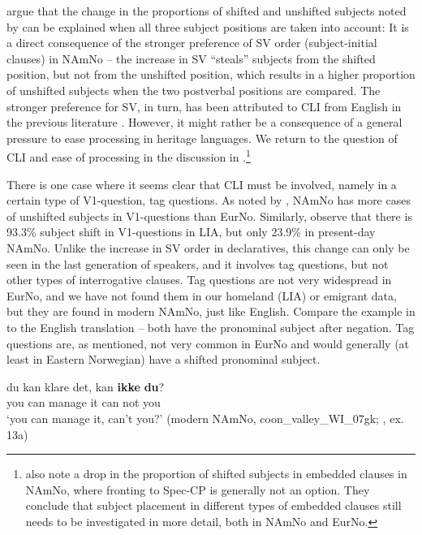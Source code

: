 \documentclass[output=paper]{langscibook}
\begin{document}
\citet{LarssonForthcoming} argue that the change in the proportions of shifted and unshifted subjects noted by \citet{AnderssenWestergaard2020} can be explained when all three subject positions are taken into account: It is a direct consequence of the stronger preference of SV order (subject-initial clauses) in NAmNo – the increase in SV “steals” subjects from the shifted position, but not from the unshifted position, which results in a higher proportion of unshifted subjects when the two postverbal positions are compared. The stronger preference for SV, in turn, has been attributed to CLI from English in the previous literature \citep{WestergaardEtAl2021}. However, it might rather be a consequence of a general pressure to ease processing in heritage languages. We return to the question of CLI and ease of processing in the discussion in .\footnote{\citet{LarssonForthcoming} also note a drop in the proportion of shifted subjects in embedded clauses in NAmNo, where fronting to Spec-CP is generally not an option. They conclude that subject placement in different types of embedded clauses still needs to be investigated in more detail, both in NAmNo and EurNo.}\largerpage 

There is one case where it seems clear that CLI must be involved, namely in a certain type of V1-question, tag questions. As noted by \citet{AnderssenWestergaard2020}, NAmNo has more cases of unshifted subjects in V1-questions than EurNo. Similarly, \citet{LarssonForthcoming} observe that there is 93.3\% subject shift in V1-questions in LIA, but only 23.9\% in present-day NAmNo. Unlike the increase in SV order in declaratives, this change can only be seen in the last generation of speakers, and it involves tag questions, but not other types of interrogative clauses. Tag questions are not very widespread in EurNo, and we have not found them in our homeland (LIA) or emigrant data, but they are found in modern NAmNo, just like English. Compare the example in  to the English translation – both have the pronominal subject after negation. Tag questions are, as mentioned, not very common in EurNo and would generally (at least in Eastern Norwegian) have a shifted pronominal subject.

\ea 
\gll du   kan   klare     det,   kan   \textbf{ikke}  \textbf{du}?\\
	 you   can   manage   it   can   not   you\\
\glt ‘you can manage it, can’t you?’ (modern NAmNo, coon\_valley\_WI\_07gk; \citealt{LarssonForthcoming}, ex. 13a)\label{ex:larsson:11}\\
\z
\end{document}
